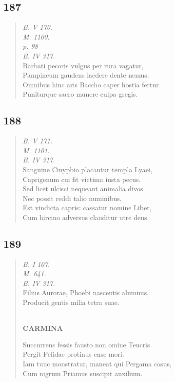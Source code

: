 \documentclass[11pt, a4paper]{report}
\begin{document}
            \subsection*{187}
      \begin{verse}
      \textit{B. V 170.} \\ \textit{M. 1100.} \\ \textit{p. 98} \\ \textit{B. IV 317.} \\ Barbati pecoris vulgus per rura vagatur, \\ Pampineum gaudens laedere dente nemus. \\ Omnibus hinc aris Baccho caper hostia fertur \\ Puniturque sacro munere culpa gregis. \\ 
      \end{verse}
  
            \subsection*{188}
      \begin{verse}
      \textit{B. V 171.} \\ \textit{M. 1101.} \\ \textit{B. IV 317.} \\ Sanguine Cinypbio placantur templa Lyaei, \\ Caprigenum cui fit victima iusta pecus. \\ Sed licet ulcisci nequeant animalia divos \\ Nec possit reddi talio numinibus, \\ Est vindicta capris: cassatur nomine Liber, \\ Cum hircino adversus clauditur utre deus. \\ 
      \end{verse}
  
            \subsection*{189}
      \begin{verse}
      \textit{B. I 107.} \\ \textit{M. 641.} \\ \textit{B. IV 317.} \\ Filius Aurorae, Phoebi nascentis alumnus, \\ Producit gentis milia tetra suae. \\ 
        ﻿\pagebreak 
     \marginpar{[158]} \begin{center} \textbf{CARMINA} \end{center}Succurrens fessis fausto non omine Teucris \\ Pergit Pelidae protinus ense mori. \\ Iam tunc monstratur, maneat qui Pergama casus, \\ Cum nigrum Priamus suscipit anxilium. \\ 
      \end{verse}
  
\end{document}
